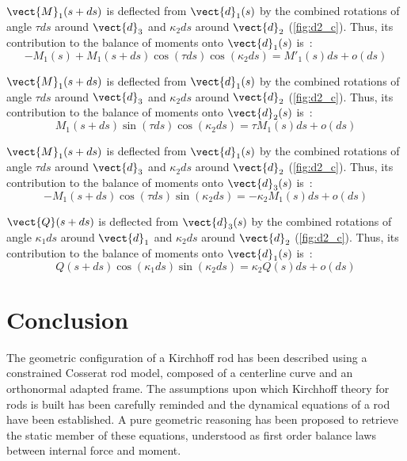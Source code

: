 $\vect{M}_1(s+ds)$ is deflected from $\vect{d}_1(s)$ by the combined rotations of angle $\tau ds$ around $\vect{d}_3$ and $\kappa_2 ds$ around $\vect{d}_2$ (\cref{fig:d2_c}). Thus, its contribution to the balance of moments onto $\vect{d}_1(s)$ is~:
\begin{equation*}
	-M_1(s) + M_1(s+ds) \cos(\tau ds) \cos(\kappa_2 ds) = M'_1 (s) ds + o(ds)
\end{equation*}

$\vect{M}_1(s+ds)$ is deflected from $\vect{d}_1(s)$ by the combined rotations of angle $\tau ds$ around $\vect{d}_3$ and $\kappa_2 ds$ around $\vect{d}_2$ (\cref{fig:d2_c}). Thus, its contribution to the balance of moments onto $\vect{d}_2(s)$ is~:
\begin{equation*}
	M_1(s+ds) \sin(\tau ds) \cos(\kappa_2 ds) = \tau M_1 (s) ds + o(ds)
\end{equation*}

$\vect{M}_1(s+ds)$ is deflected from $\vect{d}_1(s)$ by the combined rotations of angle $\tau ds$ around $\vect{d}_3$ and $\kappa_2 ds$ around $\vect{d}_2$ (\cref{fig:d2_c}). Thus, its contribution to the balance of moments onto $\vect{d}_3(s)$ is~:
\begin{equation*}
	-M_1(s+ds) \cos(\tau ds) \sin(\kappa_2 ds) = -\kappa_2 M_1 (s) ds + o(ds)
\end{equation*}

$\vect{Q}(s+ds)$ is deflected from $\vect{d}_3(s)$ by the combined rotations of angle $\kappa_1 ds$ around $\vect{d}_1$ and $\kappa_2 ds$ around $\vect{d}_2$ (\cref{fig:d2_c}). Thus, its contribution to the balance of moments onto $\vect{d}_1(s)$ is~:
\begin{equation*}
	Q(s+ds) \cos(\kappa_1 ds) \sin(\kappa_2 ds) = \kappa_2 Q(s) ds + o(ds)
\end{equation*}

\clearpage
\section{Conclusion}
The geometric configuration of a Kirchhoff rod has been described using a constrained Cosserat rod model, composed of a centerline curve and an orthonormal adapted frame. The assumptions upon which Kirchhoff theory for rods is built has been carefully reminded and the dynamical equations of a rod have been established. A pure geometric reasoning has been proposed to retrieve the static member of these equations, understood as first order balance laws between internal force and moment.

